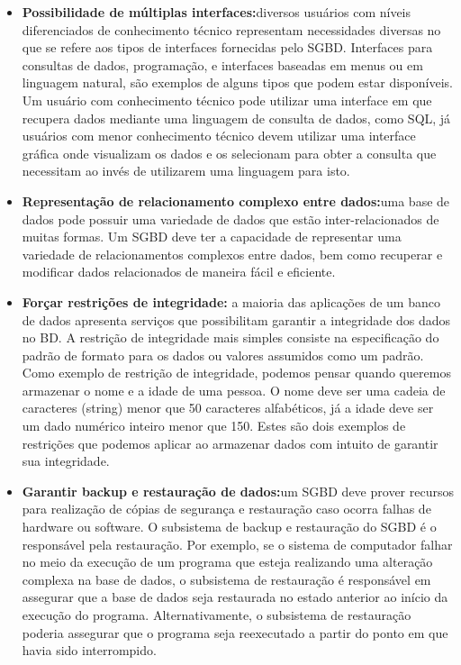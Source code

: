 \documentclass{article}
\begin{document}
\begin{itemize}
    \item \textbf{Possibilidade de múltiplas interfaces:}diversos usuários com níveis diferenciados de conhecimento técnico representam necessidades diversas no que se refere aos tipos de interfaces fornecidas pelo SGBD. Interfaces para consultas de dados, programação, e interfaces baseadas em menus ou em linguagem natural, são exemplos de alguns tipos que podem estar disponíveis. Um usuário com conhecimento técnico pode utilizar uma interface em que recupera dados mediante uma linguagem de consulta de dados, como SQL, já usuários com menor conhecimento técnico devem utilizar uma interface gráfica onde visualizam os dados e os selecionam para obter a consulta que necessitam ao invés de utilizarem uma linguagem para isto.
    \item \textbf{Representação de relacionamento complexo entre dados:}uma base de dados pode possuir uma variedade de dados que estão inter-relacionados de muitas formas. Um SGBD deve ter a capacidade de representar uma variedade de relacionamentos complexos entre dados, bem como recuperar e modificar dados relacionados de maneira fácil e eficiente.
    \item \textbf{Forçar restrições de integridade:} a maioria das aplicações de um banco de dados apresenta serviços que possibilitam garantir a integridade dos dados no BD. A restrição de integridade mais simples consiste na especificação do padrão de formato para os dados ou valores assumidos como um padrão. Como exemplo de restrição de integridade, podemos pensar quando queremos armazenar o nome e a idade de uma pessoa. O nome deve ser uma cadeia de caracteres (string) menor que 50 caracteres alfabéticos, já a idade deve ser um dado numérico inteiro menor que 150. Estes são dois exemplos de restrições que podemos aplicar ao armazenar dados com intuito de garantir sua integridade.
    \item \textbf{Garantir backup e restauração de dados:}um SGBD deve prover recursos para realização de cópias de segurança e restauração caso ocorra falhas de hardware ou software. O subsistema de backup e restauração do SGBD é o responsável pela restauração. Por exemplo, se o sistema de computador falhar no meio da execução de um programa que esteja realizando uma alteração complexa na base de dados, o subsistema de restauração é responsável em assegurar que a base de dados seja restaurada no estado anterior ao início da execução do programa. Alternativamente, o subsistema de restauração poderia assegurar que o programa seja reexecutado a partir do ponto em que havia sido interrompido.
\end{itemize}
\end{document}
